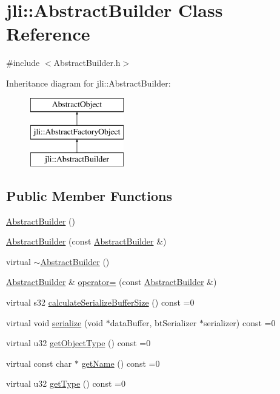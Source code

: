 \hypertarget{classjli_1_1_abstract_builder}{\section{jli\+:\+:Abstract\+Builder Class Reference}
\label{classjli_1_1_abstract_builder}
}


{\ttfamily \#include $<$Abstract\+Builder.\+h$>$}

Inheritance diagram for jli\+:\+:Abstract\+Builder\+:\begin{figure}[H]
\begin{center}
\leavevmode
\includegraphics[height=3.000000cm]{classjli_1_1_abstract_builder}
\end{center}
\end{figure}
\subsection*{Public Member Functions}
\begin{DoxyCompactItemize}
\item 
\hyperlink{classjli_1_1_abstract_builder_a25c37208a1124c8d16688ed9627b91ac}{Abstract\+Builder} ()
\item 
\hyperlink{classjli_1_1_abstract_builder_afa72506ca991fd169f99aca02cf0a56e}{Abstract\+Builder} (const \hyperlink{classjli_1_1_abstract_builder}{Abstract\+Builder} \&)
\item 
virtual \hyperlink{classjli_1_1_abstract_builder_ac685e3eedc598acfa1f8f879e8bd8767}{$\sim$\+Abstract\+Builder} ()
\item 
\hyperlink{classjli_1_1_abstract_builder}{Abstract\+Builder} \& \hyperlink{classjli_1_1_abstract_builder_af22cd8c52e03a1ce5adad70b6b9c06cf}{operator=} (const \hyperlink{classjli_1_1_abstract_builder}{Abstract\+Builder} \&)
\item 
virtual s32 \hyperlink{classjli_1_1_abstract_builder_a107ab66007cc293eb54c74e466c5d30a}{calculate\+Serialize\+Buffer\+Size} () const =0
\item 
virtual void \hyperlink{classjli_1_1_abstract_builder_a03c8719c6b852d1a21b1c7e0b7469fc0}{serialize} (void $\ast$data\+Buffer, bt\+Serializer $\ast$serializer) const =0
\item 
virtual u32 \hyperlink{classjli_1_1_abstract_builder_ab4bc84bbd7ff6f7b14b319a9dac4f67f}{get\+Object\+Type} () const =0
\item 
virtual const char $\ast$ \hyperlink{classjli_1_1_abstract_builder_a390358e86d1f93a41660bd40ec6e69dc}{get\+Name} () const =0
\item 
virtual u32 \hyperlink{classjli_1_1_abstract_builder_a826f70c995257424b7d81ab2d4706ccf}{get\+Type} () const =0
\end{DoxyCompactItemize}
